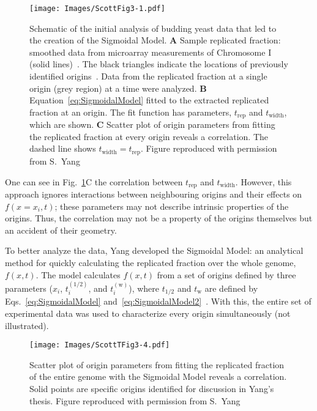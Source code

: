 {	\begin{figure}[tbh]
		\begin{center}
			\texttt{[image: Images/ScottFig3-1.pdf]}
		\end{center}
			\caption[Early analysis of budding yeast]{\label{fig:SigmoidalModel} Schematic of the initial analysis of budding yeast data that led to the creation of the Sigmoidal Model.
				\textbf{A} Sample replicated fraction: smoothed data from microarray measurements of Chromosome I (solid lines)~\cite{McCuneMicroArray}.
				The black triangles indicate the locations of previously identified origins~\cite{OriginLocations}.
				Data from the replicated fraction at a single origin (grey region) at a time were analyzed.
				\textbf{B} Equation~\ref{eq:SigmoidalModel} fitted to the extracted replicated fraction at an origin.
				The fit function has parameters, $t_{\text{rep}}$ and $t_{\text{width}}$, which are shown.
				\textbf{C} Scatter plot of origin parameters from fitting the replicated fraction at every origin reveals a correlation.
				The dashed line shows $t_{\text{width}}=t_{\text{rep}}$.
				Figure reproduced with permission from S.~Yang~\cite{ScottsThesis}}
	\end{figure}
	
	One can see in Fig.~\ref{fig:SigmoidalModel}C the correlation between $t_\text{rep}$ and $t_\text{width}$.
	However, this approach ignores interactions between neighbouring origins and their effects on $f(x=x_i,t)$; these parameters may not describe intrinsic properties of the origins.
	Thus, the correlation may not be a property of the origins themselves but an accident of their geometry.
	
	To better analyze the data, Yang developed the Sigmoidal Model: an analytical method for quickly calculating the replicated fraction over the whole genome, $f(x,t)$.
	The model calculates $f(x,t)$ from a set of origins defined by three parameters ($x_i$, $t_i^{(1/2)}$, and $t^{(\text{w})}_i$), where $t_{1/2}$ and $t_\text{w}$ are defined by Eqs.~\ref{eq:SigmoidalModel} and~\ref{eq:SigmoidalModel2}~\cite{ScottsThesis}.
	With this, the entire set of experimental data was used to characterize every origin simultaneously (not illustrated).
	
	\begin{SCfigure}[1][tbh]
		\texttt{[image: Images/ScottTFig3-4.pdf]}
		\caption[Sigmoidal model]{\label{fig:SigmoidalModel2} Scatter plot of origin parameters from fitting the replicated fraction of the entire genome with the Sigmoidal Model reveals a correlation.
			Solid points are specific origins identified for discussion in Yang's thesis.
			Figure reproduced with permission from S.~Yang~\cite{ScottsThesis}}
	\end{SCfigure}
	
}
